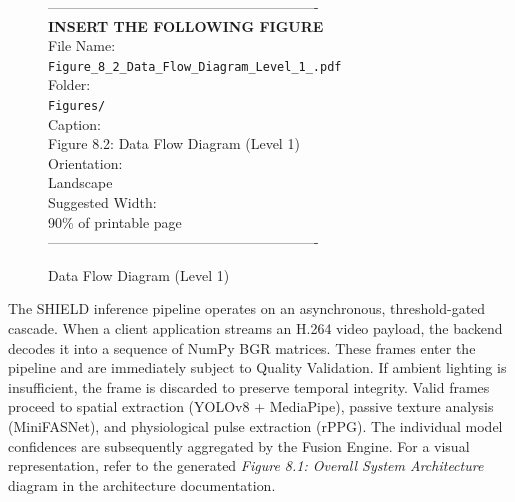 \begin{figure}[htbp]
\begin{center}
----------------------------------------------------------\\
\vspace{0.5em}
\textbf{INSERT THE FOLLOWING FIGURE}\\
\vspace{1em}
File Name:\\
\texttt{Figure\_8\_2\_Data\_Flow\_Diagram\_Level\_1\_.pdf}\\
\vspace{1em}
Folder:\\
\texttt{Figures/}\\
\vspace{1em}
Caption:\\
Figure 8.2: Data Flow Diagram (Level 1)\\
\vspace{1em}
Orientation:\\
Landscape\\
\vspace{1em}
Suggested Width:\\
90\% of printable page\\
\vspace{3cm}
----------------------------------------------------------
\end{center}
\caption{Data Flow Diagram (Level 1)}
\label{fig:diag_14}
\end{figure}
\vspace{1em}
The SHIELD inference pipeline operates on an asynchronous, threshold-gated cascade. When a client application streams an H.264 video payload, the backend decodes it into a sequence of NumPy BGR matrices. These frames enter the pipeline and are immediately subject to Quality Validation. If ambient lighting is insufficient, the frame is discarded to preserve temporal integrity. Valid frames proceed to spatial extraction (YOLOv8 + MediaPipe), passive texture analysis (MiniFASNet), and physiological pulse extraction (rPPG). The individual model confidences are subsequently aggregated by the Fusion Engine. For a visual representation, refer to the generated \textit{Figure 8.1: Overall System Architecture} diagram in the architecture documentation.

